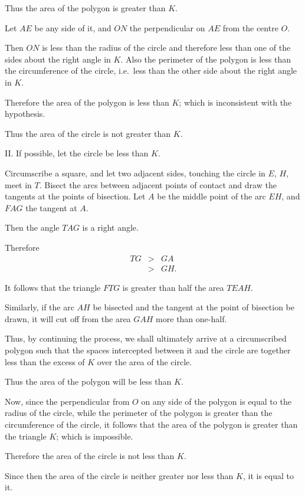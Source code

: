 \documentclass[twoside,openright]{article}
\begin{document}
Thus the area of the polygon is greater than $K$.

Let $AE$ be any side of it, and $ON$ the perpendicular on $AE$ from
the centre $O$.

Then $ON$ is less than the radius of the circle and therefore less
than one of the sides about the right angle in $K$.  Also the
perimeter of the polygon is less than the circumference of the circle,
i.e.\ less than the other side about the right angle in $K$.

Therefore the area of the polygon is less than $K$; which is
inconsistent with the hypothesis.

Thus the area of the circle is not greater than $K$.

II. If possible, let the circle be less than $K$.

Circumscribe a square, and let two adjacent sides, touching the circle
in $E$, $H$, meet in $T$.  Bisect the arcs between adjacent points of
contact and draw the tangents at the points of bisection.  Let $A$ be
the middle point of the arc $EH$, and $FAG$ the tangent at $A$.

Then the angle $TAG$ is a right angle.

Therefore
$$\begin{array}{ccc}
  TG &>& GA\\
     &>& GH.
\end{array}$$

It follows that the triangle $FTG$ is greater than half the area $TEAH$.

Similarly, if the arc $AH$ be bisected and the tangent at the point of
bisection be drawn, it will cut off from the area $GAH$ more than
one-half.

Thus, by continuing the process, we shall ultimately arrive at a
circumscribed polygon such that the spaces intercepted between it and
the circle are together less than the excess of $K$ over the area of
the circle.

Thus the area of the polygon will be less than $K$.

Now, since the perpendicular from $O$ on any side of the polygon is
equal to the radius of the circle, while the perimeter of the polygon
is greater than the circumference of the circle, it follows that the
area of the polygon is greater than the triangle $K$; which is
impossible.

Therefore the area of the circle is not less than $K$.

Since then the area of the circle is neither greater nor less than
$K$, it is equal to it.
\end{document}
